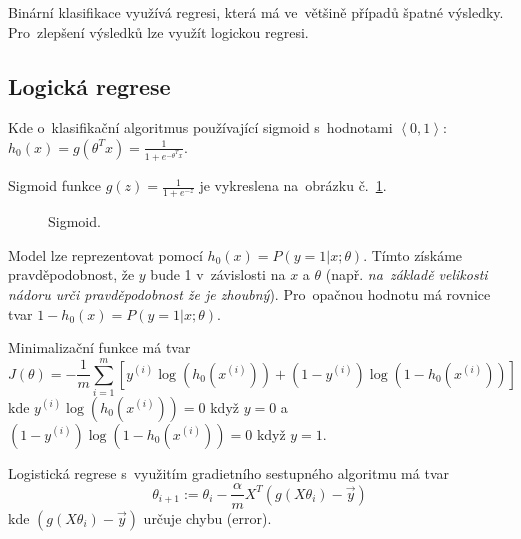 Binární klasifikace využívá regresi, která má ve~většině případů špatné výsledky.
Pro~zlepšení výsledků lze využít logickou regresi.

\subsection{Logická regrese}

Kde o~klasifikační algoritmus používající sigmoid s~hodnotami $\left<0, 1\right>$:
$h_0(x) = g(\theta^T x) = \frac{1}{1+e^{-\theta^T x}}$.

Sigmoid funkce $g(z) = \frac{1}{1+e^{-z}}$ je vykreslena na~obrázku č.~\ref{logisticka-regrese-sigmoid}.

\begin{figure}[ht]
    \onehalfspacing
    \centering
    \caption{Sigmoid.}
    \label{logisticka-regrese-sigmoid}
\end{figure}

Model lze reprezentovat pomocí $h_0(x) = P(y = 1 | x ; \theta)$. 
Tímto získáme pravděpodobnost, že $y$ bude 1 v~závislosti na $x$ a $\theta$
(např. \emph{na~základě velikosti nádoru urči pravděpodobnost že je zhoubný}).
Pro~opačnou hodnotu má rovnice tvar $1 - h_0(x) = P(y = 1 | x ; \theta)$.

Minimalizační funkce má tvar 
$$
J(\theta) = -\frac{1}{m} \sum_{i=1}^{m} \left[ y^{(i)}\log(h_0(x^{(i)})) + (1-y^{(i)})\log(1 - h_0(x^{(i)})) \right]
$$
kde $y^{(i)}\log(h_0(x^{(i)})) = 0$ když $y = 0$ a $(1-y^{(i)})\log(1 - h_0(x^{(i)})) = 0$ když $y = 1$.

Logistická regrese s~využitím gradietního sestupného algoritmu má tvar 
$$
\theta_{i+1} := \theta_i - \frac{\alpha}{m} X^T(g(X\theta_i) - \vec{y})
$$
kde $(g(X\theta_i) - \vec{y})$ určuje chybu (error).


